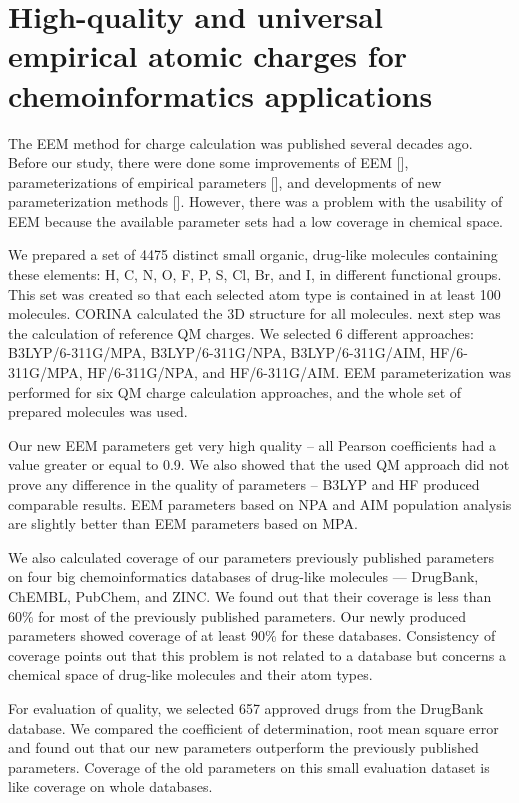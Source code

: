 \section{High-quality and universal empirical atomic charges for
chemoinformatics applications} \label{sec:param-article}

The EEM method for charge calculation was published several decades ago.
Before our study, there were done some improvements of EEM [], parameterizations
of empirical parameters [], and developments of new parameterization methods [].
However, there was a problem with the usability of EEM because the available
parameter sets had a low coverage in chemical space.    

We prepared a set of 4475 distinct small organic, drug-like molecules containing
these elements: H, C, N, O, F, P, S, Cl, Br, and I, in different functional
groups. This set was created so that each selected atom type is contained
in at least 100 molecules. CORINA calculated the 3D structure for all molecules.
\The next step was the calculation of reference QM charges. We selected
6 different approaches: B3LYP/6-311G/MPA, B3LYP/6-311G/NPA, B3LYP/6-311G/AIM,
HF/6-311G/MPA, HF/6-311G/NPA, and HF/6-311G/AIM. EEM parameterization was
performed for six QM charge calculation approaches, and the whole
set of prepared molecules was used.

Our new EEM parameters get very high quality -- all Pearson coefficients had
a value greater or equal to 0.9. We also showed that the used QM approach did
not prove any difference in the quality of parameters -- B3LYP and HF produced
comparable results. EEM parameters based on NPA and AIM population analysis are
slightly better than EEM parameters based on MPA.

 We also calculated coverage of our parameters previously published parameters
 on four big chemoinformatics databases of drug-like molecules — DrugBank,
 ChEMBL, PubChem, and ZINC. We found out that their coverage is less than 60\%
 for most of the previously published parameters.  Our newly produced parameters
 showed coverage of at least 90\% for these databases. Consistency of coverage
 points out that this problem is not related to a database but concerns
 a chemical space of drug-like molecules and their atom types.

For evaluation of quality, we selected 657 approved drugs from the DrugBank
database. We compared the coefficient of determination, root mean square error
and found out that our new parameters outperform the previously published
parameters. Coverage of the old parameters on this small evaluation dataset
is like coverage on whole databases.

